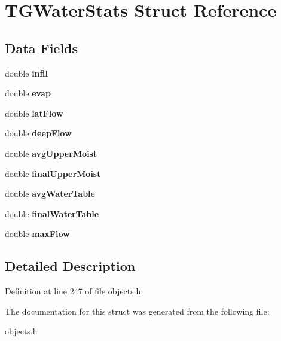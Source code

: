 \hypertarget{struct_t_g_water_stats}{}\section{T\+G\+Water\+Stats Struct Reference}
\label{struct_t_g_water_stats}
\subsection*{Data Fields}
\begin{DoxyCompactItemize}
\item 
\mbox{\label{struct_t_g_water_stats_a870be47f33955d02d624bc9de06adad0}} 
double {\bfseries infil}
\item 
\mbox{\label{struct_t_g_water_stats_a90a48831849f8794a1ab4988b4755e23}} 
double {\bfseries evap}
\item 
\mbox{\label{struct_t_g_water_stats_a72918c46f78c5eea5518078b84e68030}} 
double {\bfseries lat\+Flow}
\item 
\mbox{\label{struct_t_g_water_stats_a4ee8f5cd25df69eab4e1341e7676cc77}} 
double {\bfseries deep\+Flow}
\item 
\mbox{\label{struct_t_g_water_stats_ad2339e3ae10ef7731a9fc7479ee004f1}} 
double {\bfseries avg\+Upper\+Moist}
\item 
\mbox{\label{struct_t_g_water_stats_a3627ee54b6bdaf0d1defebfb893f752a}} 
double {\bfseries final\+Upper\+Moist}
\item 
\mbox{\label{struct_t_g_water_stats_a73191e8622c635aee7e864e111fdd6be}} 
double {\bfseries avg\+Water\+Table}
\item 
\mbox{\label{struct_t_g_water_stats_a9576125189c394cb45470c88a4e7f619}} 
double {\bfseries final\+Water\+Table}
\item 
\mbox{\label{struct_t_g_water_stats_a50e437bc9d75ebd303d3e48e56416ad3}} 
double {\bfseries max\+Flow}
\end{DoxyCompactItemize}


\subsection{Detailed Description}


Definition at line 247 of file objects.\+h.



The documentation for this struct was generated from the following file\+:\begin{DoxyCompactItemize}
\item 
objects.\+h\end{DoxyCompactItemize}

